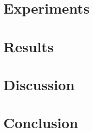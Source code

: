 \documentclass[a4paper]{article}
\begin{document}
\section{Experiments}

\section{Results}

\section{Discussion}

\section{Conclusion}
\end{document}
